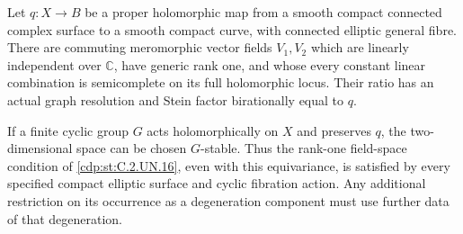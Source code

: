 
\begin{proposition}\label{cdp:st:C.2.UN.26}
Let $q:X\to B$ be a proper holomorphic map from a
smooth compact connected complex surface to a smooth
compact curve, with connected elliptic general fibre.
There are commuting meromorphic vector fields $V_1,V_2$
which are linearly independent over $\mathbb C$, have
generic rank one, and whose every constant linear
combination is semicomplete on its full holomorphic
locus. Their ratio has an actual graph resolution and
Stein factor birationally equal to $q$.

If a finite cyclic group $G$ acts holomorphically on
$X$ and preserves $q$, the two-dimensional space can
be chosen $G$-stable. Thus the rank-one field-space
condition of \ref{cdp:st:C.2.UN.16}, even with this equivariance,
is satisfied by every specified compact elliptic
surface and cyclic fibration action. Any additional
restriction on its occurrence as a degeneration
component must use further data of that degeneration.
\end{proposition}


